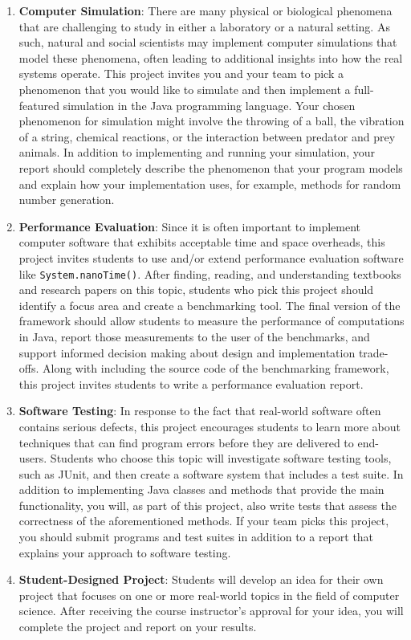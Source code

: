 \documentclass[11pt]{article}
\newcommand{\program}[1]{\lstinline{#1}}
\begin{document}
\begin{enumerate}
  \item {\bf Computer Simulation}: There are many physical or biological
    phenomena that are challenging to study in either a laboratory or a natural
    setting. As such, natural and social scientists may implement computer
    simulations that model these phenomena, often leading to additional insights
    into how the real systems operate. This project invites you and your team to
    pick a phenomenon that you would like to simulate and then implement a
    full-featured simulation in the Java programming language. Your chosen
    phenomenon for simulation might involve the throwing of a ball, the
    vibration of a string, chemical reactions, or the interaction between
    predator and prey animals. In addition to implementing and running your
    simulation, your report should completely describe the phenomenon that your
    program models and explain how your implementation uses, for example,
    methods for random number generation.

  \item {\bf Performance Evaluation}: Since it is often important to implement
    computer software that exhibits acceptable time and space overheads, this
    project invites students to use and/or extend performance evaluation
    software like \program{System.nanoTime()}. After finding, reading, and
    understanding textbooks and research papers on this topic, students who pick
    this project should identify a focus area and create a benchmarking tool.
    The final version of the framework should allow students to measure the
    performance of computations in Java, report those measurements to the user
    of the benchmarks, and support informed decision making about design and
    implementation trade-offs. Along with including the source code of the
    benchmarking framework, this project invites students to write a performance
    evaluation report.

  \item {\bf Software Testing}: In response to the fact that real-world software
    often contains serious defects, this project encourages students to learn
    more about techniques that can find program errors before they are delivered
    to end-users. Students who choose this topic will investigate software
    testing tools, such as JUnit, and then create a software system that
    includes a test suite. In addition to implementing Java classes and methods
    that provide the main functionality, you will, as part of this project, also
    write tests that assess the correctness of the aforementioned methods. If
    your team picks this project, you should submit programs and test suites in
    addition to a report that explains your approach to software testing.

  \item {\bf Student-Designed Project}: Students will develop an idea for their
    own project that focuses on one or more real-world topics in the field of
    computer science. After receiving the course instructor's approval for your
    idea, you will complete the project and report on your results.

\end{enumerate}
\end{document}
